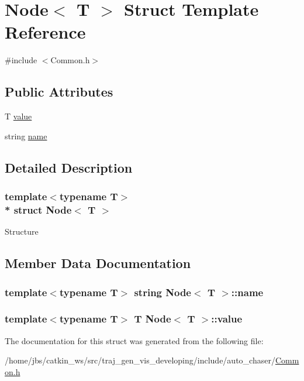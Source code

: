 \hypertarget{struct_node}{}\section{Node$<$ T $>$ Struct Template Reference}
\label{struct_node}


{\ttfamily \#include $<$Common.\+h$>$}

\subsection*{Public Attributes}
\begin{DoxyCompactItemize}
\item 
T \hyperlink{struct_node_a01b9071c0de774c720b64583262d1559}{value}
\item 
string \hyperlink{struct_node_a795bdc93cbf63ccddcdf2168d858492c}{name}
\end{DoxyCompactItemize}


\subsection{Detailed Description}
\subsubsection*{template$<$typename T$>$\\*
struct Node$<$ T $>$}

Structure 

\subsection{Member Data Documentation}
\subsubsection[{\texorpdfstring{name}{name}}]{\setlength{\rightskip}{0pt plus 5cm}template$<$typename T$>$ string {\bf Node}$<$ T $>$\+::name}\hypertarget{struct_node_a795bdc93cbf63ccddcdf2168d858492c}{}\label{struct_node_a795bdc93cbf63ccddcdf2168d858492c}
\subsubsection[{\texorpdfstring{value}{value}}]{\setlength{\rightskip}{0pt plus 5cm}template$<$typename T$>$ T {\bf Node}$<$ T $>$\+::value}\hypertarget{struct_node_a01b9071c0de774c720b64583262d1559}{}\label{struct_node_a01b9071c0de774c720b64583262d1559}


The documentation for this struct was generated from the following file\+:\begin{DoxyCompactItemize}
\item 
/home/jbs/catkin\+\_\+ws/src/traj\+\_\+gen\+\_\+vis\+\_\+developing/include/auto\+\_\+chaser/\hyperlink{_common_8h}{Common.\+h}\end{DoxyCompactItemize}
